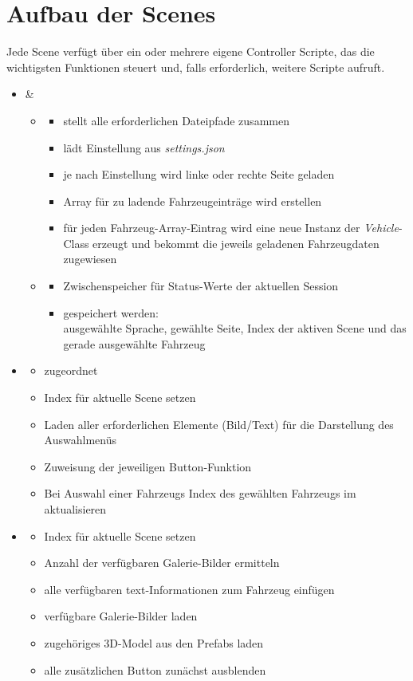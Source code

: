 \section{Aufbau der Scenes}
\label{sec:scenestruct}
%
Jede Scene verfügt über ein oder mehrere eigene Controller Scripte, das die wichtigsten Funktionen steuert und, falls erforderlich, weitere Scripte aufruft.
%
\begin{itemize}
	\item \pres{} \rarr \dls{} \& \sss{}
	\begin{itemize}
		\item \dls{}
		\begin{itemize}
			\item stellt alle erforderlichen Dateipfade zusammen
			\item lädt Einstellung aus \emph{settings.json}
			\item je nach Einstellung wird linke oder rechte Seite geladen
			\item Array für zu ladende Fahrzeugeinträge wird erstellen
			\item für jeden Fahrzeug-Array-Eintrag wird eine neue Instanz der \emph{Vehicle}-Class erzeugt und bekommt die jeweils geladenen Fahrzeugdaten zugewiesen
		\end{itemize}
		\item \ssc{}
		\begin{itemize}
			\item Zwischenspeicher für Status-Werte der aktuellen Session
			\item gespeichert werden:\\
			ausgewählte Sprache, gewählte Seite, Index der aktiven Scene und das gerade ausgewählte Fahrzeug 
		\end{itemize}
	\end{itemize}
	\item \mms{} \rarr \mss{}
	\begin{itemize}
		\item \msco{} zugeordnet
		\item Index für aktuelle Scene setzen
		\item Laden aller erforderlichen Elemente (Bild/Text) für die Darstellung des Auswahlmenüs
		\item Zuweisung der jeweiligen Button-Funktion
		\item Bei Auswahl einer Fahrzeugs \rarr Index des gewählten Fahrzeugs im \sss{} aktualisieren
	\end{itemize}
	\item \vhs{} \rarr{} \vehss
	\begin{itemize}
		\item Index für aktuelle Scene setzen
		\item Anzahl der verfügbaren Galerie-Bilder ermitteln
		\item alle verfügbaren text-Informationen zum Fahrzeug einfügen
		\item verfügbare Galerie-Bilder laden
		\item zugehöriges 3D-Model aus den Prefabs laden
		\item alle zusätzlichen Button zunächst ausblenden
	\end{itemize}
\end{itemize}
%
